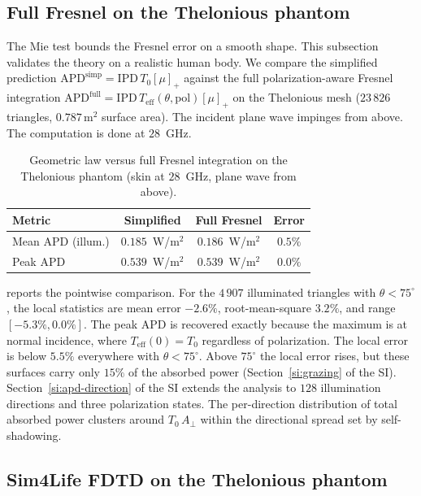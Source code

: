 \documentclass[journal,twocolumn,10pt]{IEEEtran}
\theoremstyle{plain}
\newcommand{\IPD}{\mathrm{IPD}}
\newcommand{\APD}{\mathrm{APD}}
\newcommand{\Aperp}{A_\perp}
\newcommand{\Teff}{T_{\mathrm{eff}}}
\newcommand{\pospart}[1]{\left[#1\right]_{+}}
\begin{document}
\subsection{Full Fresnel on the Thelonious phantom}\label{subsec:val-fresnel}

The Mie test bounds the Fresnel error on a smooth shape. This
subsection validates the theory on a realistic human body. We compare the simplified
prediction $\APD^{\mathrm{simp}} = \IPD\,T_0 \pospart{\mu}$ against
the full polarization-aware Fresnel integration $\APD^{\mathrm{full}}
= \IPD\,\Teff(\theta, \mathrm{pol}) \pospart{\mu}$ on the Thelonious
mesh ($23\,826$ triangles, $0.787\,\mathrm{m}^2$ surface area). The
incident plane wave impinges from above. The computation is done at
$28$~GHz.

\begin{table}[!t]
\centering
\caption{Geometric law versus full Fresnel integration on the
Thelonious phantom (skin at $28$~GHz, plane wave from above).}
\label{tab:phantom}
\begin{tabular}{lccc}
\toprule
Metric & Simplified & Full Fresnel & Error \\
\midrule
Mean $\APD$ (illum.)     & $0.185$~W/m$^2$ & $0.186$~W/m$^2$ & $0.5\%$ \\
Peak $\APD$              & $0.539$~W/m$^2$ & $0.539$~W/m$^2$ & $0.0\%$ \\
\bottomrule
\end{tabular}
\end{table}

 reports the pointwise comparison. For the
$4\,907$ illuminated triangles with
$\theta < 75^\circ$, the local statistics are mean error $-2.6\%$,
root-mean-square $3.2\%$, and range $[-5.3\%, 0.0\%]$. The peak
$\APD$ is recovered exactly because the maximum is at normal incidence,
where $\Teff(0) = T_0$ regardless of polarization. The local error is
below $5.5\%$ everywhere with $\theta < 75^\circ$. Above $75^\circ$
the local error rises, but these surfaces carry only $15\%$ of the
absorbed power (Section~\ref{si:grazing} of the SI).
Section~\ref{si:apd-direction} of the SI extends the analysis to
$128$ illumination directions and three polarization states. The
per-direction distribution of total absorbed power clusters around
$T_0\,\Aperp$ within the directional spread set by self-shadowing.

\subsection{Sim4Life FDTD on the Thelonious phantom}\label{subsec:val-fdtd}
\end{document}
